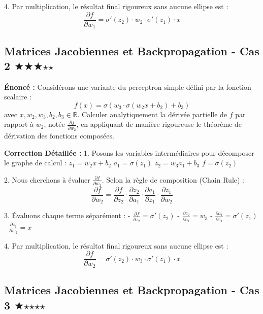 \documentclass[11pt,a4paper]{article}
\begin{document}
4. Par multiplication, le résultat final rigoureux sans aucune ellipse est :
   $$ \frac{{\partial f}}{{\partial w_{1}}} = \sigma'(z_2) \cdot w_{2} \cdot \sigma'(z_1) \cdot x $$

\vspace{1cm}

\subsection*{Matrices Jacobiennes et Backpropagation - Cas 2 $\bigstar$$\bigstar$$\bigstar$$\star$$\star$}

\textbf{Énoncé :}
Considérons une variante du perceptron simple défini par la fonction scalaire :
$$ f(x) = \sigma(w_{3} \cdot \sigma(w_{2} x + b_{2}) + b_{3}) $$
avec $x, w_{2}, w_{3}, b_{2}, b_{3} \in \mathbb{R}$.
Calculer analytiquement la dérivée partielle de $f$ par rapport à $w_{2}$, notée $\frac{{\partial f}}{{\partial w_{2}}}$, en appliquant de manière rigoureuse le théorème de dérivation des fonctions composées.

\textbf{Correction Détaillée :}
1. Posons les variables intermédiaires pour décomposer le graphe de calcul :
   $z_1 = w_{2} x + b_{2}$
   $a_1 = \sigma(z_1)$
   $z_2 = w_{3} a_1 + b_{3}$
   $f = \sigma(z_2)$

2. Nous cherchons à évaluer $\frac{{\partial f}}{{\partial w_{2}}}$. Selon la règle de composition (Chain Rule) :
   $$ \frac{{\partial f}}{{\partial w_{2}}} = \frac{{\partial f}}{{\partial z_2}} \cdot \frac{{\partial z_2}}{{\partial a_1}} \cdot \frac{{\partial a_1}}{{\partial z_1}} \cdot \frac{{\partial z_1}}{{\partial w_{2}}} $$

3. Évaluons chaque terme séparément :
   - $\frac{{\partial f}}{{\partial z_2}} = \sigma'(z_2)$
   - $\frac{{\partial z_2}}{{\partial a_1}} = w_{3}$
   - $\frac{{\partial a_1}}{{\partial z_1}} = \sigma'(z_1)$
   - $\frac{{\partial z_1}}{{\partial w_{2}}} = x$

4. Par multiplication, le résultat final rigoureux sans aucune ellipse est :
   $$ \frac{{\partial f}}{{\partial w_{2}}} = \sigma'(z_2) \cdot w_{3} \cdot \sigma'(z_1) \cdot x $$

\vspace{1cm}

\subsection*{Matrices Jacobiennes et Backpropagation - Cas 3 $\bigstar$$\star$$\star$$\star$$\star$}
\end{document}
